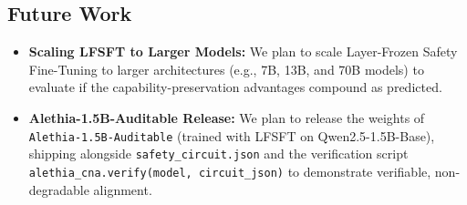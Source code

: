 \documentclass[11pt]{article}
\begin{document}
\subsection{Future Work}
\begin{itemize}
    \item \textbf{Scaling LFSFT to Larger Models:} We plan to scale Layer-Frozen Safety Fine-Tuning to larger architectures (e.g., 7B, 13B, and 70B models) to evaluate if the capability-preservation advantages compound as predicted.
    \item \textbf{Alethia-1.5B-Auditable Release:} We plan to release the weights of \texttt{Alethia-1.5B-Auditable} (trained with LFSFT on Qwen2.5-1.5B-Base), shipping alongside \texttt{safety\_circuit.json} and the verification script \texttt{alethia\_cna.verify(model, circuit\_json)} to demonstrate verifiable, non-degradable alignment.
\end{itemize}
\end{document}
